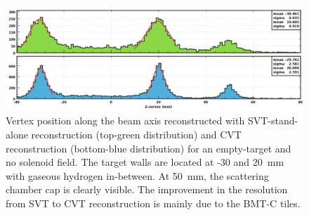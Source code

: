 \begin{figure}[htb]
 \includegraphics[width=2.0\columnwidth,keepaspectratio]{images/NIM_SVTvsCVT.png}
 \caption{Vertex position along the beam axis reconstructed with SVT-stand-alone reconstruction (top-green distribution) and
   CVT reconstruction (bottom-blue distribution) for an empty-target and no solenoid field. The target walls are located at
   -30 and 20~mm with gaseous hydrogen in-between. At 50~mm, the scattering chamber cap is clearly visible. The improvement
   in the resolution from SVT to CVT reconstruction is mainly due to the BMT-C tiles.}
 \label{fig:mm-zvertex}
\end{figure}
